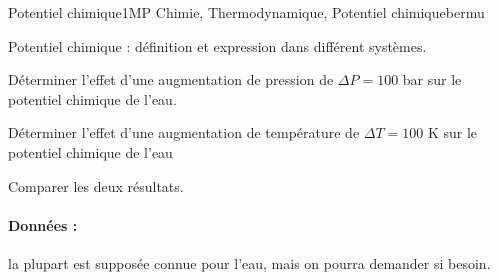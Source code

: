\begin{exercise}{Potentiel chimique}{1}{MP}
{Chimie, Thermodynamique, Potentiel chimique}{bermu}


\begin{questions}
    \questioncours Potentiel chimique : définition et expression dans différent systèmes.
    
    \question Déterminer l'effet d'une augmentation de pression de $\Delta P = 100$ bar sur le potentiel chimique de l'eau.
    
    \question Déterminer l'effet d'une augmentation de température de $\Delta T = 100$ K sur le potentiel chimique de l'eau
    Comparer les deux résultats.

\end{questions}

\paragraph{Données :} la plupart est supposée connue pour l'eau, mais on pourra demander si besoin.

\end{exercise}

